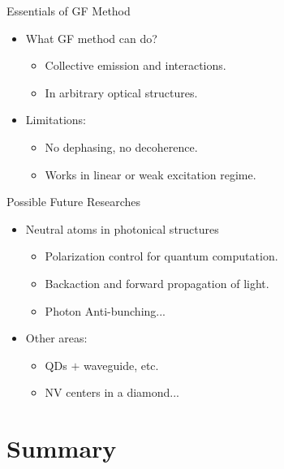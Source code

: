 \documentclass{beamer}
\begin{document}
\begin{frame}{Essentials of GF Method}
\begin{itemize}
  \item
    \alert{What GF method can do?}
    \begin{itemize}
        \item
          Collective emission and interactions.
        \item
          In arbitrary optical structures.
     \end{itemize}
     \pause
  \item
    \alert{Limitations:}
    \begin{itemize}
        \item
          No dephasing, no decoherence.
        \item
          Works in linear or weak excitation regime.
     \end{itemize}
  \end{itemize}

\end{frame}

\begin{frame}{Possible Future Researches}
\begin{itemize}
  \item
    \alert{Neutral atoms in photonical structures}
    \begin{itemize}
        \item
          Polarization control for quantum computation.
        \item
          Backaction and forward propagation of light.
        \item
          Photon Anti-bunching...
     \end{itemize}
  \item
    \alert{Other areas:}
    \begin{itemize}
        \item
          QDs $+$ waveguide, etc.
        \item
          NV centers in a diamond...
     \end{itemize}
\end{itemize}


\end{frame}





\section*{Summary}
\end{document}
